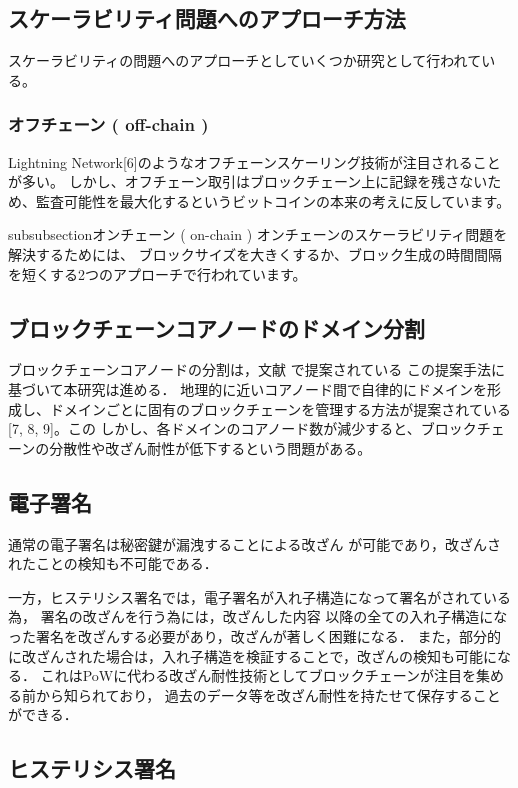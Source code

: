 \documentclass[a4paper,12pt]{jsarticle}
\begin{document}
      \subsection*{スケーラビリティ問題へのアプローチ方法}
スケーラビリティの問題へのアプローチとしていくつか研究として行われている。

          \subsubsection{オフチェーン ( off-chain )}
Lightning Network[6]のようなオフチェーンスケーリング技術が注目されることが多い。
しかし、オフチェーン取引はブロックチェーン上に記録を残さないため、監査可能性を最大化するというビットコインの本来の考えに反しています。

          subsubsection{オンチェーン ( on-chain )}
オンチェーンのスケーラビリティ問題を解決するためには、
ブロックサイズを大きくするか、ブロック生成の時間間隔を短くする2つのアプローチで行われています。

\subsection{ブロックチェーンコアノードのドメイン分割}
ブロックチェーンコアノードの分割は，文献 \cite{fujihara1}\cite{fujihara2}で提案されている
この提案手法に基づいて本研究は進める．
地理的に近いコアノード間で自律的にドメインを形成し、ドメインごとに固有のブロックチェーンを管理する方法が提案されている[7, 8, 9]。この
しかし、各ドメインのコアノード数が減少すると、ブロックチェーンの分散性や改ざん耐性が低下するという問題がある。

      \subsection{電子署名}
通常の電子署名は秘密鍵が漏洩することによる改ざん
が可能であり，改ざんされたことの検知も不可能である．

一方，ヒステリシス署名では，電子署名が入れ子構造になって署名がされている為，
署名の改ざんを行う為には，改ざんした内容
以降の全ての入れ子構造になった署名を改ざんする必要があり，改ざんが著しく困難になる．
また，部分的に改ざんされた場合は，入れ子構造を検証することで，改ざんの検知も可能になる．
これはPoWに代わる改ざん耐性技術としてブロックチェーンが注目を集める前から知られており，
過去のデータ等を改ざん耐性を持たせて保存することができる．

      \subsection{ヒステリシス署名}
\end{document}
